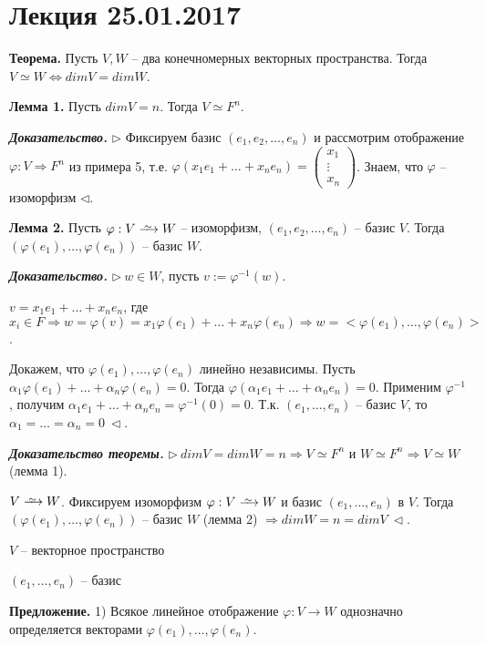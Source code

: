 \section{Лекция 25.01.2017}

\textbf{Теорема.} Пусть $V, W$ -- два конечномерных векторных пространства. Тогда $V \simeq W \Leftrightarrow dimV = dimW$.

\bigskip
\textbf{Лемма 1.} Пусть $dimV = n$. Тогда $V \simeq F^n$.

\bigskip
\textbf{\textit{Доказательство.}} $\rhd$ Фиксируем базис $(e_1, e_2, \dots, e_n)$ и рассмотрим отображение $\varphi: V \Rightarrow F^n$ из примера 5, т.е. $\varphi (x_1 e_1 + \dots + x_n e_n) = \begin{pmatrix} x_1 \\ \vdots \\ x_n \end{pmatrix}$. Знаем, что $\varphi$ -- изоморфизм $\lhd$.

\bigskip
\textbf{Лемма 2.} Пусть $\varphi : V \iso W$ -- изоморфизм, $(e_1, e_2, \dots, e_n)$ -- базис $V$. Тогда $(\varphi (e_1), \dots, \varphi (e_n))$ -- базис $W$.

\bigskip
\textbf{\textit{Доказательство.}} $\rhd \ w \in W$, пусть $v := \varphi^{-1} (w)$.

$v = x_1 e_1 + \dots + x_n e_n$, где $x_i \in F \Rightarrow w = \varphi (v) = x_1 \varphi(e_1) + \dots + x_n \varphi (e_n) \Rightarrow w = <\varphi(e_1), \dots, \varphi(e_n)>$.

Докажем, что $\varphi(e_1), \dots, \varphi(e_n)$ линейно независимы. Пусть $\alpha_1 \varphi(e_1) + \dots + \alpha_n \varphi(e_n) = 0$. Тогда $\varphi (\alpha_1 e_1 + \dots + \alpha_n e_n) = 0$. Применим $\varphi^{-1}$, получим $\alpha_1 e_1 + \dots + \alpha_n e_n = \varphi^{-1}(0) = 0$. Т.к. $(e_1, \dots, e_n)$ -- базис $V$, то $\alpha_1=\dots=\alpha_n = 0 \ \lhd$.

\bigskip
\textbf{\textit{Доказательство теоремы.}} $\rhd \ dimV = dimW = n \Rightarrow V \simeq F^n$ и $W \simeq F^n \Rightarrow V \simeq W$ (лемма 1).

$V \iso W$. Фиксируем изоморфизм $\varphi : V \iso W$ и базис $(e_1, \dots, e_n)$ в $V$. Тогда $(\varphi(e_1), \dots, \varphi(e_n))$ -- базис $W$ (лемма 2) $\Rightarrow dimW = n = dimV \ \lhd$.

\bigskip
$V$ -- векторное пространство

$(e_1, \dots, e_n)$ -- базис

\bigskip
\textbf{Предложение.} 1) Всякое линейное отображение $\varphi : V \rightarrow W$ однозначно определяется векторами $\varphi(e_1), \dots, \varphi(e_n)$.

